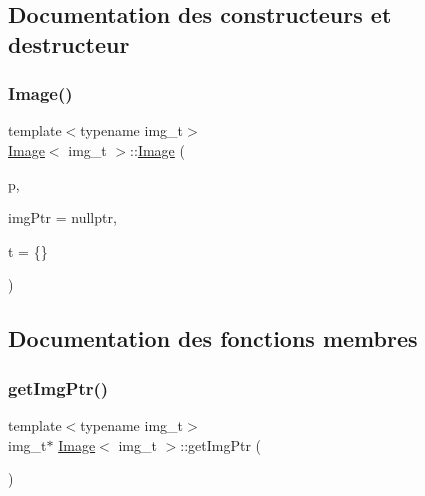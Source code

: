 \subsection{Documentation des constructeurs et destructeur}
\mbox{\label{class_image_abc511289078a75b6565adaa1c697b2b8}} 
\subsubsection{\texorpdfstring{Image()}{Image()}}
{\footnotesize\ttfamily template$<$typename img\+\_\+t$>$ \\
\hyperlink{class_image}{Image}$<$ img\+\_\+t $>$\+::\hyperlink{class_image}{Image} (\begin{DoxyParamCaption}\item[{std\+::experimental\+::filesystem\+::path}]{p,  }\item[{std\+::unique\+\_\+ptr$<$ img\+\_\+t $>$}]{img\+Ptr = {\ttfamily nullptr},  }\item[{\hyperlink{_tag_list_8hpp_ac0222328791bb6c859b87ac65d5e9f65}{Tag\+List}}]{t = {\ttfamily \{\}} }\end{DoxyParamCaption})\hspace{0.3cm}{\ttfamily [inline]}}



\subsection{Documentation des fonctions membres}
\mbox{\label{class_image_a368ba28239858cff26afe25c0101d7bb}} 
\subsubsection{\texorpdfstring{get\+Img\+Ptr()}{getImgPtr()}}
{\footnotesize\ttfamily template$<$typename img\+\_\+t$>$ \\
img\+\_\+t$\ast$ \hyperlink{class_image}{Image}$<$ img\+\_\+t $>$\+::get\+Img\+Ptr (\begin{DoxyParamCaption}{ }\end{DoxyParamCaption})\hspace{0.3cm}{\ttfamily [inline]}}

\mbox{\label{class_image_a0f940439733c6b4e65f192400119e6d2}} 
